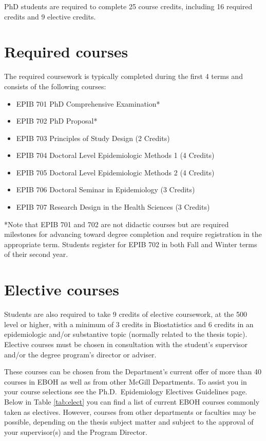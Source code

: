 \documentclass[
  openany]{book}
\providecommand{\tightlist}{%
  \setlength{\itemsep}{0pt}\setlength{\parskip}{0pt}}
\begin{document}
PhD students are required to complete 25 course credits, including 16 required credits and 9 elective credits.

\hypertarget{required-courses}{%
\section{Required courses}\label{required-courses}}

The required coursework is typically completed during the first 4 terms and consists of the following courses:

\begin{itemize}
\tightlist
\item
  EPIB 701 PhD Comprehensive Examination*
\item
  EPIB 702 PhD Proposal*
\item
  EPIB 703 Principles of Study Design (2 Credits)
\item
  EPIB 704 Doctoral Level Epidemiologic Methods 1 (4 Credits)
\item
  EPIB 705 Doctoral Level Epidemiologic Methods 2 (4 Credits)
\item
  EPIB 706 Doctoral Seminar in Epidemiology (3 Credits)
\item
  EPIB 707 Research Design in the Health Sciences (3 Credits)
\end{itemize}

*Note that EPIB 701 and 702 are not didactic courses but are required milestones for advancing toward degree completion and require registration in the appropriate term. Students register for EPIB 702 in both Fall and Winter terms of their second year.

\hypertarget{elective-courses}{%
\section{Elective courses}\label{elective-courses}}

Students are also required to take 9 credits of elective coursework, at the 500 level or higher, with a minimum of 3 credits in Biostatistics and 6 credits in an epidemiologic and/or substantive topic (normally related to the thesis topic). Elective courses must be chosen in consultation with the student's supervisor and/or the degree program's director or adviser.

These courses can be chosen from the Department's current offer of more than 40 courses in EBOH as well as from other McGill Departments. To assist you in your course selections see the Ph.D.~Epidemiology Electives Guidelines page. Below in Table \ref{tab:elect} you can find a list of current EBOH courses commonly taken as electives. However, courses from other departments or faculties may be possible, depending on the thesis subject matter and subject to the approval of your supervisor(s) and the Program Director.
\end{document}
